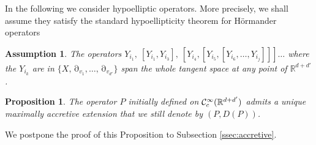 \documentclass[12pt]{amsart}
\newcommand{\R}{\mathbb R}
\numberwithin{equation}{section}
\numberwithin{figure}{section}
\DeclareMathOperator{\p}{\partial}
\newtheorem{proposition}[defin]{Proposition}
\newtheorem{assumption}{Assumption}
\begin{document}
In the following we consider hypoelliptic operators. More precisely, we shall assume they satisfy the standard hypoellipticity theorem for Hörmander operators \cite[Theorem 1.1]{Ho67}
\begin{assumption}\label{ass.Hormander}
    The operators $Y_{i_1},\ [Y_{i_1},Y_{i_3}],\ [Y_{i_4},[Y_{i_5},[Y_{i_6},\ldots,Y_{i_j}]]]\ldots$ where the $Y_{i_k}$ are in $\{X,\p_{v_1},\ldots,\p_{v_{d'}}\}$ span the whole tangent space %
at any point of $\R^{d+d'}$.
\end{assumption}

\begin{proposition}\label{prop:accretive}
The operator $P$ initially defined on $\ccc^\infty_c(\R^{d+d'})$ admits a %
unique maximally accretive extension that we still denote by $(P,D(P))$.
\end{proposition}
We postpone the proof of this Proposition to Subsection \ref{ssec:accretive}.
\end{document}
